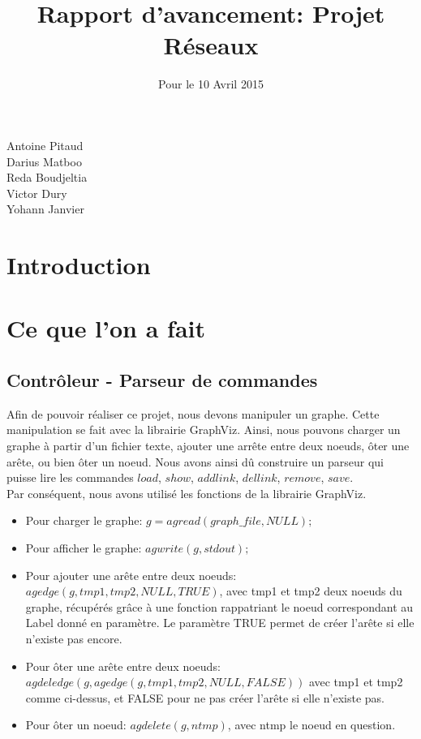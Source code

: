 \documentclass[a4paper,11pts]{article}
\begin{document}
\title{Rapport d'avancement: Projet Réseaux}
\date{Pour le 10 Avril 2015}
\maketitle

\begin{center}
  Antoine Pitaud\\
  Darius Matboo\\
  Reda Boudjeltia\\
  Victor Dury\\
  Yohann Janvier

\end{center}
\maketitle

\section{Introduction}


\tableofcontents
\newpage
\section{Ce que l'on a fait}
\subsection{Contrôleur - Parseur de commandes}
\indent Afin de pouvoir réaliser ce projet, nous devons manipuler un graphe. Cette manipulation se fait avec la librairie GraphViz. Ainsi, nous pouvons charger un graphe à partir d'un fichier texte, ajouter une arrête entre deux noeuds, ôter une arête, ou bien ôter un noeud. Nous avons ainsi dû construire un parseur qui puisse lire les commandes $load$, $show$, $add link$, $del link$, $remove$, $save$. \\
\indent Par conséquent, nous avons utilisé les fonctions de la librairie GraphViz.
\begin{itemize}
\item Pour charger le graphe: $g = agread(graph\_file, NULL);$
\item Pour afficher le graphe: $agwrite(g, stdout);$
\item Pour ajouter une arête entre deux noeuds: \\$agedge(g, tmp1, tmp2, NULL, TRUE)$, avec tmp1 et tmp2 deux noeuds du graphe, récupérés grâce à une fonction rappatriant le noeud correspondant au Label donné en paramètre. Le paramètre TRUE permet de créer l'arête si elle n'existe pas encore.
\item Pour ôter une arête entre deux noeuds:\\$agdeledge(g, agedge(g, tmp1, tmp2, NULL, FALSE))$ avec tmp1 et tmp2 comme ci-dessus, et FALSE pour ne pas créer l'arête si elle n'existe pas.
\item Pour ôter un noeud: $agdelete(g, ntmp)$, avec ntmp le noeud en question.
\end{itemize}
\end{document}
